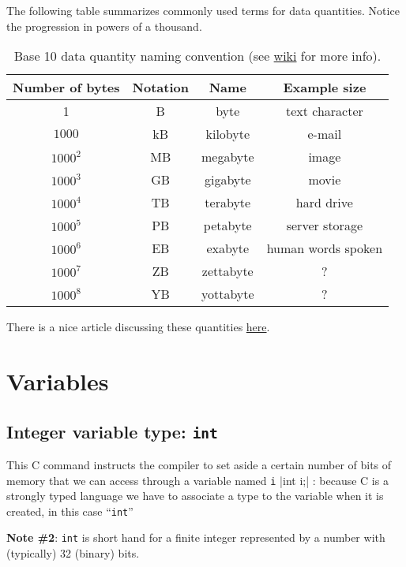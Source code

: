 The following table summarizes commonly used terms for data quantities. Notice the progression in powers of a thousand. 

\begin{table}[htbp!]
    \centering
    \begin{tabular}{c|c|c|c} \hline
    Number of bytes & Notation & Name & Example size  \\  \hline
    1    &  B   & byte    & text character \\
$1000$   &	kB	& kilobyte & e-mail\\
$1000^2$ &	MB	& megabyte & image\\
$1000^3$ &	GB	& gigabyte & movie\\
$1000^4$ &	TB	& terabyte & hard drive \\
$1000^5$ &	PB	& petabyte & server storage\\
$1000^6$ &	EB	& exabyte & human words spoken\\
$1000^7$ &	ZB	& zettabyte & ?\\
$1000^8$ &	YB	& yottabyte & ? \\ \hline
    \end{tabular}
    \caption{Base 10 data quantity naming convention (see \href{https://en.wikipedia.org/wiki/Orders_of_magnitude_(data)}{wiki} for more info).}
    \label{base10Bytes.tab}
\end{table}

There is a nice article discussing these quantities \href{https://pradeepedwin.wordpress.com/mb-gb-tb-pb-eb-zb-yb-bb/}{here}.

\section{Variables}


\subsection{Integer variable type: \texttt{int}}

This C command instructs the compiler to set aside a certain number of bits of  memory that we can access through a variable named \texttt{i}
|int i;|
: because C is a strongly typed language we have to associate a type to the variable when it is created, in this case ``\texttt{int}''

{\bf Note \#2}: \texttt{int} is short hand for a finite integer represented by a number with (typically) 32 (binary) bits.

